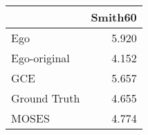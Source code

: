 \begin{tabular}{lr}
\toprule
{} & Smith60 \\
\midrule
Ego          &   5.920 \\
Ego-original &   4.152 \\
GCE          &   5.657 \\
Ground Truth &   4.655 \\
MOSES        &   4.774 \\
\bottomrule
\end{tabular}
